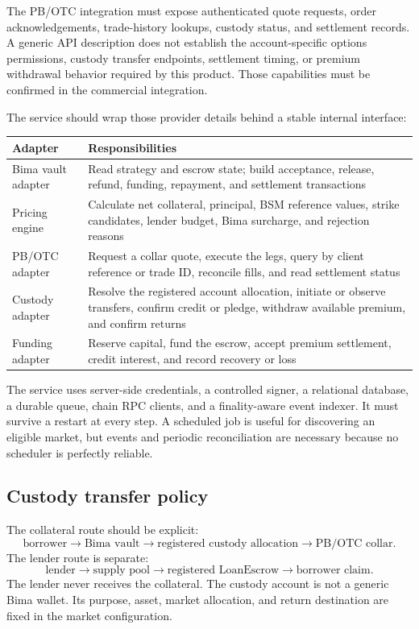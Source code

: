 \documentclass[11pt,oneside]{article}
\begin{document}
The PB/OTC integration must expose authenticated quote requests, order acknowledgements, trade-history lookups, custody status, and settlement records. A generic API description does not establish the account-specific options permissions, custody transfer endpoints, settlement timing, or premium withdrawal behavior required by this product. Those capabilities must be confirmed in the commercial integration.

The service should wrap those provider details behind a stable internal interface:

\begin{center}
\begin{tabularx}{\textwidth}{@{}p{}Y@{}}
\toprule
\textbf{Adapter} & \textbf{Responsibilities} \\
\midrule
Bima vault adapter & Read strategy and escrow state; build acceptance, release, refund, funding, repayment, and settlement transactions \\
Pricing engine & Calculate net collateral, principal, BSM reference values, strike candidates, lender budget, Bima surcharge, and rejection reasons \\
PB/OTC adapter & Request a collar quote, execute the legs, query by client reference or trade ID, reconcile fills, and read settlement status \\
Custody adapter & Resolve the registered account allocation, initiate or observe transfers, confirm credit or pledge, withdraw available premium, and confirm returns \\
Funding adapter & Reserve capital, fund the escrow, accept premium settlement, credit interest, and record recovery or loss \\
\bottomrule
\end{tabularx}
\end{center}

The service uses server-side credentials, a controlled signer, a relational database, a durable queue, chain RPC clients, and a finality-aware event indexer. It must survive a restart at every step. A scheduled job is useful for discovering an eligible market, but events and periodic reconciliation are necessary because no scheduler is perfectly reliable.

\subsection{Custody transfer policy}

The collateral route should be explicit:
\[
\text{borrower}\rightarrow\text{Bima vault}\rightarrow\text{registered custody allocation}\rightarrow\text{PB/OTC collar}.
\]
The lender route is separate:
\[
\text{lender}\rightarrow\text{supply pool}\rightarrow\text{registered LoanEscrow}\rightarrow\text{borrower claim}.
\]
The lender never receives the collateral. The custody account is not a generic Bima wallet. Its purpose, asset, market allocation, and return destination are fixed in the market configuration.
\end{document}
